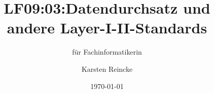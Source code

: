 \documentclass[]{beamer}
\title{LF09:03:Datendurchsatz und andere Layer-I-II-Standards}
\subtitle{für Fachinformatikerin}
\institute[GS-LDK]{Gewerbliche Schulen Dillenburg}
\author{Karsten Reincke}
\date{\today}
\def\cfgGl{../../../cfg.gl/}
\begin{document}

\begin{frame}
  \titlepage

  
\end{frame}






\logo{}
\newpage



%
\end{document}
